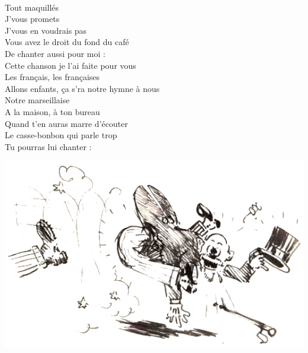 \\Tout maquillés
\\J'vous promets
\\J'vous en voudrais pas
\\Vous avez le droit du fond du café
\\De chanter aussi pour moi :
\\Cette chanson je l'ai faite pour vous
\\Les français, les françaises
\\Allons enfants, ça s'ra notre hymne à nous
\\Notre marseillaise
\\A la maison, à ton bureau
\\Quand t'en auras marre d'écouter
\\Le casse-bonbon qui parle trop
\\Tu pourras lui chanter :

\vspace{1cm}
\begin{center}
\includegraphics[width=1\textwidth]{images/brev75.png}
\end{center}

\breakpage